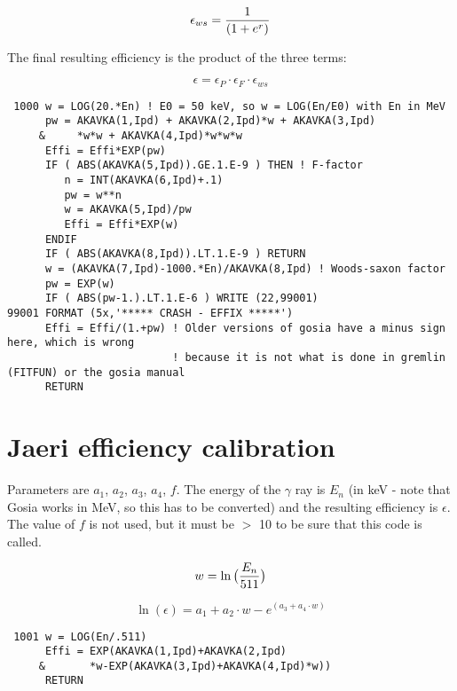 \begin{equation}
\epsilon_{ws} = {1 \over (1 + e^r)}
\end{equation}

The final resulting efficiency is the product of the three terms:

\begin{equation}
\epsilon = \epsilon_P \cdot \epsilon_F \cdot \epsilon_{ws}
\end{equation}

\begin{verbatim}
 1000 w = LOG(20.*En) ! E0 = 50 keV, so w = LOG(En/E0) with En in MeV
      pw = AKAVKA(1,Ipd) + AKAVKA(2,Ipd)*w + AKAVKA(3,Ipd)
     &     *w*w + AKAVKA(4,Ipd)*w*w*w
      Effi = Effi*EXP(pw)
      IF ( ABS(AKAVKA(5,Ipd)).GE.1.E-9 ) THEN ! F-factor
         n = INT(AKAVKA(6,Ipd)+.1)
         pw = w**n
         w = AKAVKA(5,Ipd)/pw
         Effi = Effi*EXP(w)
      ENDIF
      IF ( ABS(AKAVKA(8,Ipd)).LT.1.E-9 ) RETURN
      w = (AKAVKA(7,Ipd)-1000.*En)/AKAVKA(8,Ipd) ! Woods-saxon factor
      pw = EXP(w)
      IF ( ABS(pw-1.).LT.1.E-6 ) WRITE (22,99001)
99001 FORMAT (5x,'***** CRASH - EFFIX *****')
      Effi = Effi/(1.+pw) ! Older versions of gosia have a minus sign here, which is wrong
                          ! because it is not what is done in gremlin (FITFUN) or the gosia manual
      RETURN
\end{verbatim}

\section{Jaeri efficiency calibration}

Parameters are $a_1$, $a_2$, $a_3$, $a_4$, $f$. The energy of the $\gamma$
ray is $E_n$ (in keV - note that Gosia works in MeV, so this has to be
converted) and the resulting efficiency is $\epsilon$. The value of $f$ is
not used, but it must be $>$ 10 to be sure that this code is called.

\begin{equation}
w = \ln\big({E_n \over 511}\big)
\end{equation}

\begin{equation}
\ln(\epsilon) = a_1 + a_2 \cdot w - e^{(a_3 + a_4 \cdot w)}
\end{equation}

\begin{verbatim}
 1001 w = LOG(En/.511)
      Effi = EXP(AKAVKA(1,Ipd)+AKAVKA(2,Ipd)
     &       *w-EXP(AKAVKA(3,Ipd)+AKAVKA(4,Ipd)*w))
      RETURN
\end{verbatim}

